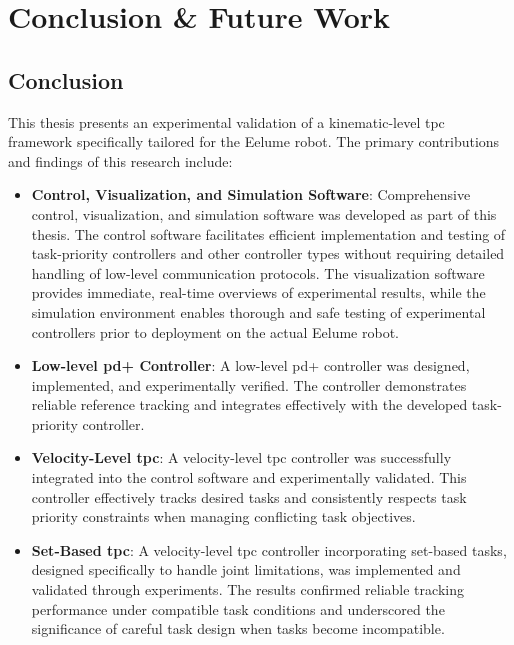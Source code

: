 \chapter{Conclusion \& Future Work}
\label{ch:conclusion}

\section{Conclusion}

This thesis presents an experimental validation of a kinematic-level \gls{tpc} framework specifically tailored for the Eelume robot. The primary contributions and findings of this research include:
\begin{itemize}
\item \textbf{Control, Visualization, and Simulation Software}: Comprehensive control, visualization, and simulation software was developed as part of this thesis. The control software facilitates efficient implementation and testing of task-priority controllers and other controller types without requiring detailed handling of low-level communication protocols. The visualization software provides immediate, real-time overviews of experimental results, while the simulation environment enables thorough and safe testing of experimental controllers prior to deployment on the actual Eelume robot.

\item \textbf{Low-level \gls{pd+} Controller}: A low-level \gls{pd+} controller was designed, implemented, and experimentally verified. The controller demonstrates reliable reference tracking and integrates effectively with the developed task-priority controller.


\item \textbf{Velocity-Level \gls{tpc}}: A velocity-level \gls{tpc} controller was successfully integrated into the control software and experimentally validated. This controller effectively tracks desired tasks and consistently respects task priority constraints when managing conflicting task objectives.

\item \textbf{Set-Based \gls{tpc}}: A velocity-level \gls{tpc} controller incorporating set-based tasks, designed specifically to handle joint limitations, was implemented and validated through experiments. The results confirmed reliable tracking performance under compatible task conditions and underscored the significance of careful task design when tasks become incompatible.
\end{itemize}

